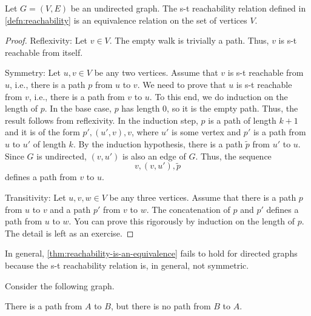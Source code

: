 \documentclass{amsart}
\begin{document}
\begin{thm}
  \label{thm:reachability-is-an-equivalence}
  Let $G = (V, E)$ be an undirected graph.
  The s-t reachability relation defined in \cref{defn:reachability} is an equivalence relation on the set of vertices $V$.
\end{thm}
\begin{proof}\hfill
  \para
  Reflexivity: Let $v \in V$.
  The empty walk is trivially a path.
  Thus, $v$ is s-t reachable from itself.

  \para
  Symmetry: Let $u,v \in V$ be any two vertices.
  Assume that $v$ is s-t reachable from $u$, i.e., there is a path $p$ from $u$ to $v$.
  We need to prove that $u$ is s-t reachable from $v$, i.e., there is a path from $v$ to $u$.
  To this end, we do induction on the length of $p$.
  In the base case, $p$ has length 0, so it is the empty path.
  Thus, the result follows from reflexivity.
  In the induction step, $p$ is a path of length $k+1$ and it is of the form $p',(u',v),v$, where $u'$ is some vertex and $p'$ is a path from $u$ to $u'$ of length $k$.
  By the induction hypothesis, there is a path $\widetilde{p}$ from $u'$ to $u$.
  Since $G$ is undirected, $(v,u')$ is also an edge of $G$.
  Thus, the sequence
  \[
    v,(v,u'),\widetilde{p}
  \]
  defines a path from $v$ to $u$.

  \para
  Transitivity: Let $u,v,w \in V$ be any three vertices.
  Assume that there is a path $p$ from $u$ to $v$ and a path $p'$ from $v$ to $w$.
  The concatenation of $p$ and $p'$ defines a path from $u$ to $w$.
  You can prove this rigorously by induction on the length of $p$.
  The detail is left as an exercise.
\end{proof}

\begin{rmk}
  \label{rmk:reachability-not-equivalence-for-directed-graphs}
  In general, \cref{thm:reachability-is-an-equivalence} fails to hold for directed graphs because the s-t reachability relation is, in general, not symmetric.
\end{rmk}

\begin{ceg}
  \label{ceg:reachability-not-equivalence-for-directed-graphs-nonexample-1}
  Consider the following graph.
  \begin{center}
  \end{center}
  There is a path from $A$ to $B$, but there is no path from $B$ to $A$.
\end{ceg}
\end{document}
